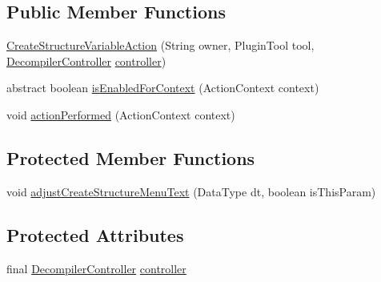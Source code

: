\subsection*{Public Member Functions}
\begin{DoxyCompactItemize}
\item 
\mbox{\hyperlink{classghidra_1_1app_1_1plugin_1_1core_1_1decompile_1_1actions_1_1_create_structure_variable_action_acd8ee20259a09a607ff81e2001edd175}{Create\+Structure\+Variable\+Action}} (String owner, Plugin\+Tool tool, \mbox{\hyperlink{classghidra_1_1app_1_1decompiler_1_1component_1_1_decompiler_controller}{Decompiler\+Controller}} \mbox{\hyperlink{classghidra_1_1app_1_1plugin_1_1core_1_1decompile_1_1actions_1_1_create_structure_variable_action_aa50d3c26a30df166fd5c8a1923ceea56}{controller}})
\item 
abstract boolean \mbox{\hyperlink{classghidra_1_1app_1_1plugin_1_1core_1_1decompile_1_1actions_1_1_create_structure_variable_action_ac9ec273aa2ced519b1cb48f8ab003c18}{is\+Enabled\+For\+Context}} (Action\+Context context)
\item 
void \mbox{\hyperlink{classghidra_1_1app_1_1plugin_1_1core_1_1decompile_1_1actions_1_1_create_structure_variable_action_a2f38da4ca96ff96fa7b34ac4fc66d2ba}{action\+Performed}} (Action\+Context context)
\end{DoxyCompactItemize}
\subsection*{Protected Member Functions}
\begin{DoxyCompactItemize}
\item 
void \mbox{\hyperlink{classghidra_1_1app_1_1plugin_1_1core_1_1decompile_1_1actions_1_1_create_structure_variable_action_ad5aad5b060b0994438c70aca92573b19}{adjust\+Create\+Structure\+Menu\+Text}} (Data\+Type dt, boolean is\+This\+Param)
\end{DoxyCompactItemize}
\subsection*{Protected Attributes}
\begin{DoxyCompactItemize}
\item 
final \mbox{\hyperlink{classghidra_1_1app_1_1decompiler_1_1component_1_1_decompiler_controller}{Decompiler\+Controller}} \mbox{\hyperlink{classghidra_1_1app_1_1plugin_1_1core_1_1decompile_1_1actions_1_1_create_structure_variable_action_aa50d3c26a30df166fd5c8a1923ceea56}{controller}}
\end{DoxyCompactItemize}


